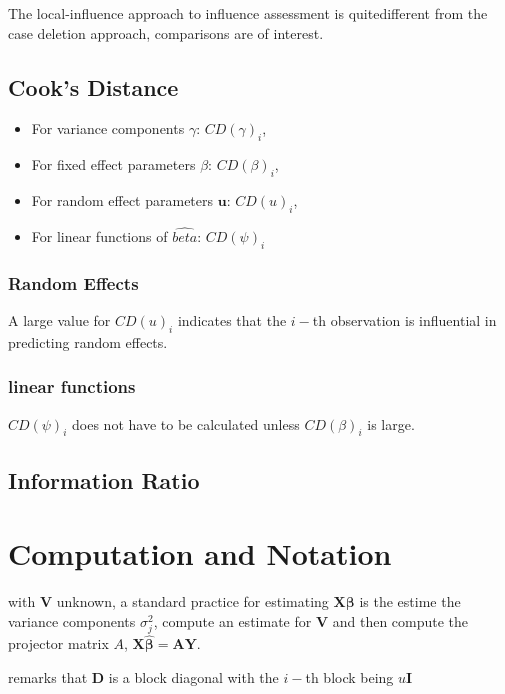 \documentclass[12pt, a4paper]{article}
\begin{document}
The local-influence approach to influence assessment is quitedifferent from the case deletion approach, comparisons are of
interest.

\newpage

\subsection{Cook's Distance}
\begin{itemize}
	\item For variance components $\gamma$: $CD(\gamma)_i$,
	\item For fixed effect parameters $\beta$: $CD(\beta)_i$,
	\item For random effect parameters $\boldsymbol{u}$: $CD(u)_i$,
	\item For linear functions of $\hat{beta}$: $CD(\psi)_i$
\end{itemize}

\newpage
\subsubsection{Random Effects}

A large value for $CD(u)_i$ indicates that the $i-$th observation is influential in predicting random effects.

\subsubsection{linear functions}

$CD(\psi)_i$ does not have to be calculated unless $CD(\beta)_i$ is large.


\subsection{Information Ratio}


\newpage
\section{Computation and Notation } %
with $\boldsymbol{V}$ unknown, a standard practice for estimating $\boldsymbol{X \beta}$ is the estime the variance components $\sigma^2_j$,
compute an estimate for $\boldsymbol{V}$ and then compute the projector matrix $A$, $\boldsymbol{X \hat{\beta}}  = \boldsymbol{AY}$.


\citet{Zewotir} remarks that $\boldsymbol{D}$ is a block diagonal with the $i-$th block being $u \boldsymbol{I}$
\end{document}
